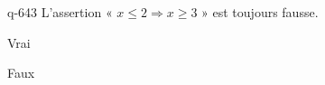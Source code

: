 \begin{truefalse}{q-643}
L'assertion « $x\leq 2 \Rightarrow x \geq 3$ » est toujours fausse.
\item Vrai
\item* Faux
\end{truefalse}

